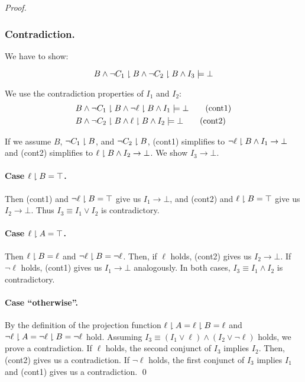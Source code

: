 \begin{techreport}
\begin{proof}
\subsubsection*{Contradiction.} 
 We have to show:
 
 \[B \land \lnot C_1\downharpoonright B \land \lnot C_2\downharpoonright B \land I_3 \models \bot\]
 
 We use the contradiction properties of $I_1$ and $I_2$:
 \begin{align*}
  & B \land \lnot C_1\downharpoonright B \land \lnot \ell\downharpoonright B \land I_1 \models \bot \tag{cont1}\\
  & B \land \lnot C_2\downharpoonright B \land \ell \downharpoonright B \land I_2 \models \bot \tag{cont2}
 \end{align*}  

 If we assume $B$, $\lnot C_1\downharpoonright B$, and $\lnot C_2\downharpoonright B$, (cont1)
 simplifies to $\lnot \ell\downharpoonright B \land I_1 \rightarrow \bot$ and (cont2)
 simplifies to $\ell\downharpoonright B \land I_2 \rightarrow \bot$. We show $I_3
 \rightarrow \bot$.

 \paragraph{Case $\ell\downharpoonright B = \top$.}

 Then (cont1) and $\lnot \ell\downharpoonright B = \top$ give us $I_1 \rightarrow \bot$,
 and (cont2) and $\ell \downharpoonright B = \top$ give us $I_2 \rightarrow \bot$. 
 Thus $I_3 \equiv I_1 \lor I_2$ is contradictory.

 \paragraph{Case $\ell\downharpoonright A = \top$.}

 Then $\ell \downharpoonright B = \ell$ and $\lnot \ell \downharpoonright B = \lnot \ell$. Then, if 
 $\ell$ holds, (cont2) gives us $I_2 \rightarrow \bot$. If $\lnot \ell$ holds, 
(cont1) gives us
 $I_1 \rightarrow \bot$ analogously. In both cases,
 $I_3 \equiv I_1 \land I_2$ is contradictory.

 \paragraph{Case ``otherwise''.}
 
 By the definition of the projection function 
 $\ell\downharpoonright A = \ell\downharpoonright B = \ell$ and 
 $\lnot \ell\downharpoonright A = \lnot \ell\downharpoonright B = \lnot \ell$ hold.
 Assuming $I_3 \equiv (I_1\lor\ell) \land (I_2\lor \lnot\ell)$ holds, we prove
 a contradiction.
 If $\ell$ holds, the second conjunct of $I_3$ implies $I_2$.
 Then, (cont2) gives us a contradiction. 
 If $\lnot \ell$ holds, the first conjunct of $I_3$ implies $I_1$
 and (cont1) gives us a contradiction.
\qed 
\end{proof}
\end{techreport}

